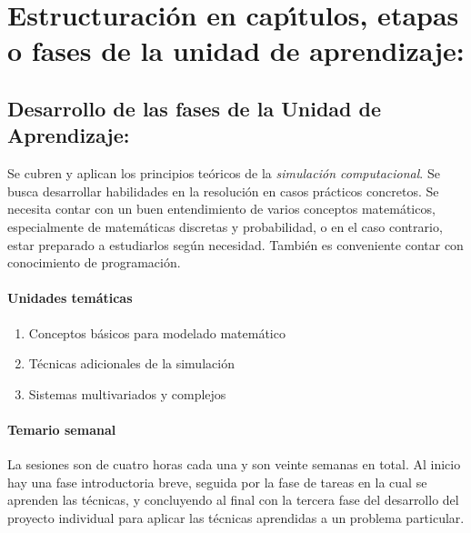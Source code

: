 \newpage

\section{Estructuraci\'{o}n en cap\'{\i}tulos, etapas o fases de la unidad de
  aprendizaje:}
\subsection{Desarrollo de las fases de la Unidad de Aprendizaje:}

\quad

Se cubren y aplican los principios te\'{o}ricos de la {\em
  simulaci\'{o}n computacional}. Se busca desarrollar habilidades en
la resoluci\'{o}n en casos pr\'{a}cticos concretos. Se necesita contar
con un buen entendimiento de varios conceptos matem\'{a}ticos,
especialmente de matem\'{a}ticas discretas y probabilidad, o en el
caso contrario, estar preparado a estudiarlos seg\'{u}n
necesidad. Tambi\'{e}n es conveniente contar con conocimiento de
programaci\'{o}n.

\paragraph{Unidades tem\'{a}ticas}

\begin{enumerate}[itemsep=-3pt]
\item Conceptos b\'{a}sicos para modelado matem\'{a}tico
\item T\'{e}cnicas adicionales de la simulaci\'{o}n
\item Sistemas multivariados y complejos
\end{enumerate}
  
\paragraph{Temario semanal}

\quad

La sesiones son de cuatro horas cada una y son veinte semanas en
total. Al inicio hay una fase introductoria breve, seguida por la fase de
tareas en la cual se aprenden las t\'{e}cnicas, y concluyendo al final
con la tercera fase del desarrollo del proyecto individual para
aplicar las t\'{e}cnicas aprendidas a un problema particular.

